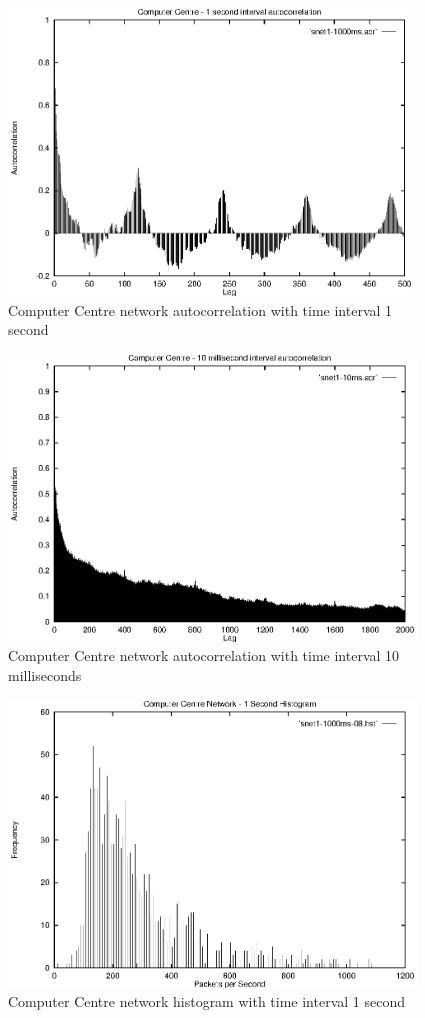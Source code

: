 \begin{figure}
\includegraphics[height=3in]{pics/snet1-1s-acr.eps}
\caption{Computer Centre network autocorrelation with time interval 1 second}
\label{results:snet1.1s.acr}
\end{figure}

\begin{figure}
\includegraphics[height=3in]{pics/snet1-10ms-acr.eps}
\caption{Computer Centre network autocorrelation with time interval 10 milliseconds}
\label{results:snet1.10ms.acr}
\end{figure}

\begin{figure}
\includegraphics[height=3in]{pics/snet1-1s-hist-08.eps}
\caption{Computer Centre network histogram with time interval 1 second}
\label{results:snet1.1s.hist}
\end{figure}

